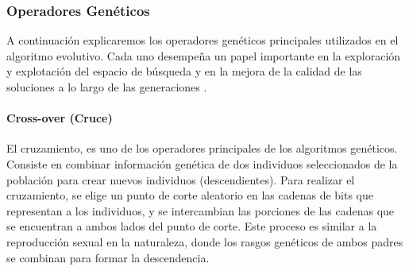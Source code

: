 \subsubsection{Operadores Genéticos}

A continuación explicaremos los operadores genéticos principales utilizados en
el algoritmo evolutivo. Cada uno desempeña un papel importante en la exploración
y explotación  del espacio de búsqueda y en la mejora de la
calidad de las soluciones a lo largo de las generaciones
.

\paragraph{Cross-over (Cruce)}
El cruzamiento, es uno de los operadores principales de los algoritmos genéticos. Consiste en combinar información genética de dos individuos seleccionados de la población para crear nuevos individuos (descendientes). Para realizar el cruzamiento, se elige un punto de corte aleatorio en las cadenas de bits que representan a los individuos, y se intercambian las porciones de las cadenas que se encuentran a ambos lados del punto de corte. Este proceso es similar a la reproducción sexual en la naturaleza, donde los rasgos genéticos de ambos padres se combinan para formar la descendencia.









